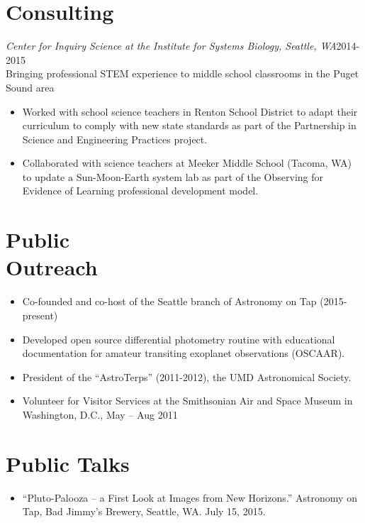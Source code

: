 \documentclass[margin]{res}
\begin{document}
\begin{resume}
\section{Consulting}
{\sl Center for Inquiry Science at the Institute for Systems Biology, Seattle, WA}\hfill2014-2015\\
Bringing professional STEM experience to middle school classrooms in the Puget Sound area
\begin{itemize}   
\item Worked with school science teachers in Renton School District to adapt their curriculum to comply with new state standards as part of the Partnership in Science and Engineering Practices project. 
\item Collaborated with science teachers at Meeker Middle School (Tacoma, WA) to update a Sun-Moon-Earth system lab as part of the Observing for Evidence of Learning professional development model.\\
\end{itemize}

\section{Public \\ Outreach}             
\begin{itemize}
\item Co-founded and co-host of the Seattle branch of Astronomy on Tap (2015-present)

\item Developed open source differential photometry routine with educational documentation for amateur transiting exoplanet observations (OSCAAR).

\item President of the ``AstroTerps'' (2011-2012), the UMD Astronomical Society.

\item Volunteer for Visitor Services at the Smithsonian Air and Space Museum in Washington, D.C., May -- Aug 2011\\
\end{itemize}


\section{Public Talks}
\begin{itemize}
\item ``Pluto-Palooza -- a First Look at Images from New Horizons.'' Astronomy on Tap, Bad Jimmy's Brewery, Seattle, WA. July 15, 2015.


\end{itemize}
\end{resume}
\end{document}
